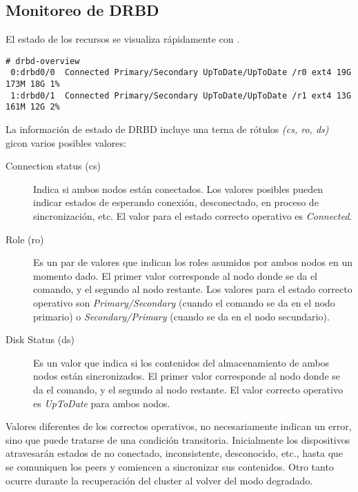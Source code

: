 \subsection{Monitoreo de DRBD}

El estado de los recursos se visualiza rápidamente con .

\begin{lstlisting}
# drbd-overview 
 0:drbd0/0  Connected Primary/Secondary UpToDate/UpToDate /r0 ext4 19G 173M 18G 1% 
 1:drbd0/1  Connected Primary/Secondary UpToDate/UpToDate /r1 ext4 13G 161M 12G 2% 
\end{lstlisting}

La información de estado de DRBD incluye una terna de rótulos \textit{(cs, ro, ds)} gicon varios posibles valores:

\begin{description}
	\item[Connection status (cs)] Indica si ambos nodos están conectados. Los valores posibles pueden indicar estados de esperando conexión, desconectado, en proceso de sincronización, etc. El valor para el estado correcto operativo es \textit{Connected}. 

	\item[Role (ro)] Es un par de valores que indican los roles asumidos por ambos nodos en un momento dado. El primer valor corresponde al nodo donde se da el comando, y el segundo al nodo restante. Los valores para el estado correcto operativo son \textit{Primary/Secondary} (cuando el comando se da en el nodo primario) o \textit{Secondary/Primary} (cuando se da en el nodo secundario).

	\item[Disk Status (ds)] Es un valor que indica si los contenidos del almacenamiento de ambos nodos están sincronizados. El primer valor corresponde al nodo donde se da el comando, y el segundo al nodo restante. El valor correcto operativo es \textit{UpToDate} para ambos nodos.
 
\end{description}

Valores diferentes de los correctos operativos, no necesariamente indican un error, sino que puede tratarse de una condición transitoria. Inicialmente los dispositivos atravesarán estados de no conectado, inconsistente, desconocido, etc., hasta que se comuniquen los peers y comiencen a sincronizar sus contenidos. Otro tanto ocurre durante la recuperación del cluster al volver del modo degradado. 

